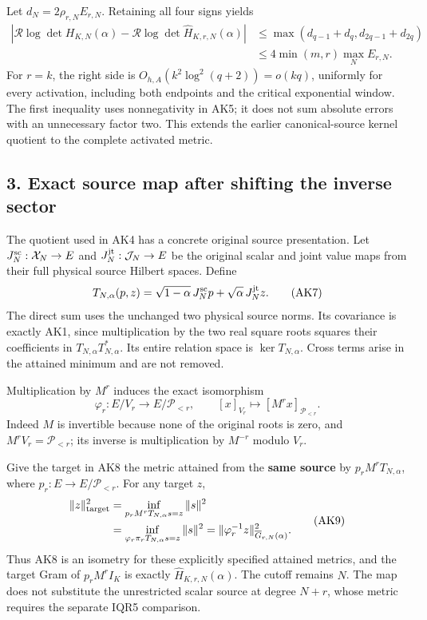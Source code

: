 \documentclass[11pt]{article}
\begin{document}
Let \(d_N=2\rho_{r,N}E_{r,N}\). Retaining all four signs yields \[
\begin{split}
\left|\mathcal R\log\det H_{K,N}(\alpha)
-\mathcal R\log\det\widehat H_{K,r,N}(\alpha)\right|
&\le \max(d_{q-1}+d_q,d_{2q-1}+d_{2q})\\
&\le4\min(m,r)\max_N E_{r,N}.
\end{split}
\tag{AK6}
\] For \(r=k\), the right side is \(O_{h,A}(k^2\log^2(q+2))=o(kq)\), uniformly for every activation, including both endpoints and the critical exponential window. The first inequality uses nonnegativity in AK5; it does not sum absolute errors with an unnecessary factor two. This extends the earlier canonical-source kernel quotient to the complete activated metric.

\subsection{3. Exact source map after shifting the inverse sector}\label{exact-source-map-after-shifting-the-inverse-sector}

The quotient used in AK4 has a concrete original source presentation. Let \(J_N^{\rm sc}:\mathcal X_N\to E\) and \(J_N^{\rm jt}:\mathcal J_N\to E\) be the original scalar and joint value maps from their full physical source Hilbert spaces. Define \[
T_{N,\alpha}(p,z)
 =\sqrt{1-\alpha}\,J_N^{\rm sc}p+
   \sqrt{\alpha}\,J_N^{\rm jt}z .
\tag{AK7}
\] The direct sum uses the unchanged two physical source norms. Its covariance is exactly AK1, since multiplication by the two real square roots squares their coefficients in \(T_{N,\alpha}T_{N,\alpha}^*\). Its entire relation space is \(\ker T_{N,\alpha}\). Cross terms arise in the attained minimum and are not removed.

Multiplication by \(M^r\) induces the exact isomorphism \[
\varphi_r:E/V_r\longrightarrow E/\mathcal P_{<r},
\qquad [x]_{V_r}\longmapsto[M^rx]_{\mathcal P_{<r}}. \tag{AK8}
\] Indeed \(M\) is invertible because none of the original roots is zero, and \(M^rV_r=\mathcal P_{<r}\); its inverse is multiplication by \(M^{-r}\) modulo \(V_r\).

Give the target in AK8 the metric attained from the \textbf{same source} by \(p_rM^rT_{N,\alpha}\), where \(p_r:E\to E/\mathcal P_{<r}\). For any target \(z\), \[
\begin{split}
\|z\|_{\rm target}^2
&=\inf_{p_rM^rT_{N,\alpha}s=z}\|s\|^2\\
&=\inf_{\varphi_r\pi_rT_{N,\alpha}s=z}\|s\|^2
=\|\varphi_r^{-1}z\|_{\overline G_{r,N}(\alpha)}^2 .
\end{split}\tag{AK9}
\] Thus AK8 is an isometry for these explicitly specified attained metrics, and the target Gram of \(p_rM^rI_K\) is exactly \(\widehat H_{K,r,N}(\alpha)\). The cutoff remains \(N\). The map does not substitute the unrestricted scalar source at degree \(N+r\), whose metric requires the separate IQR5 comparison.
\end{document}
